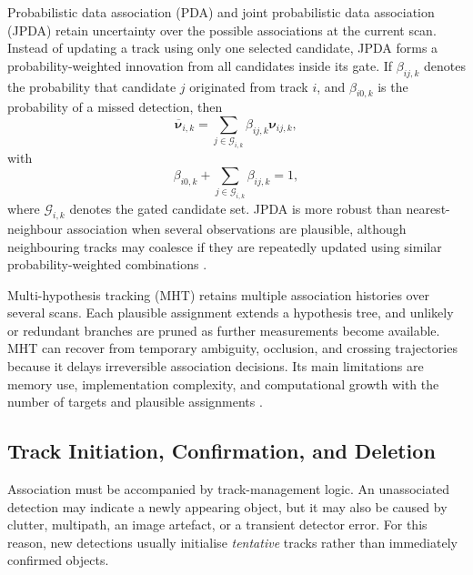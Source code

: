 Probabilistic data association (PDA) and joint probabilistic data
association (JPDA) retain uncertainty over the possible associations at
the current scan. Instead of updating a track using only one selected
candidate, JPDA forms a probability-weighted innovation from all candidates
inside its gate. If $\beta_{ij,k}$ denotes the probability that candidate
$j$ originated from track $i$, and $\beta_{i0,k}$ is the probability of a
missed detection, then
\begin{equation}
\overline{\boldsymbol{\nu}}_{i,k}=\sum_{j\in\mathcal{G}_{i,k}}\beta_{ij,k}\boldsymbol{\nu}_{ij,k},
\label{eq:jpda-innovation}
\end{equation}
with
\begin{equation}
\beta_{i0,k}+\sum_{j\in\mathcal{G}_{i,k}}\beta_{ij,k}=1,
\label{eq:jpda-probability}
\end{equation}
where $\mathcal{G}_{i,k}$ denotes the gated candidate set. JPDA is more
robust than nearest-neighbour association when several observations are
plausible, although neighbouring tracks may coalesce if they are repeatedly
updated using similar probability-weighted combinations
\cite{barshalom1995multitarget,blackman1999design,
barshalom2011tracking}.

Multi-hypothesis tracking (MHT) retains multiple association histories over
several scans. Each plausible assignment extends a hypothesis tree, and
unlikely or redundant branches are pruned as further measurements become
available. MHT can recover from temporary ambiguity, occlusion, and crossing
trajectories because it delays irreversible association decisions. Its main
limitations are memory use, implementation complexity, and computational
growth with the number of targets and plausible assignments
\cite{reid1979algorithm,blackman1999design,barshalom2011tracking}.

\subsection{Track Initiation, Confirmation, and Deletion}

Association must be accompanied by track-management logic. An unassociated
detection may indicate a newly appearing object, but it may also be caused
by clutter, multipath, an image artefact, or a transient detector error.
For this reason, new detections usually initialise \emph{tentative} tracks
rather than immediately confirmed objects.

